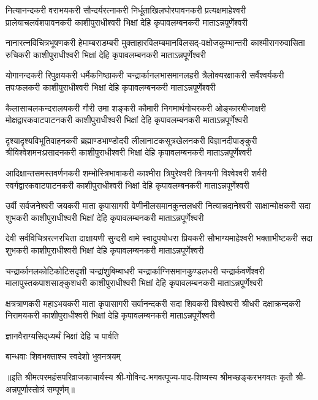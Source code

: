 
\fourlineindentedshloka
{नित्यानन्दकरी वराभयकरी सौन्दर्यरत्नाकरी}
{निर्धूताखिलघोरपावनकरी प्रत्यक्षमाहेश्वरी}
{प्रालेयाचलवंशपावनकरी काशीपुराधीश्वरी}
{भिक्षां देहि कृपावलम्बनकरी माताऽन्नपूर्णेश्वरी}

\fourlineindentedshloka
{नानारत्नविचित्रभूषणकरी हेमाम्बराडम्बरी}
{मुक्ताहारविलम्बमानविलसद्-वक्षोजकुम्भान्तरी}
{काश्मीरागरुवासिता रुचिकरी काशीपुराधीश्वरी}
{भिक्षां देहि कृपावलम्बनकरी माताऽन्नपूर्णेश्वरी}

\fourlineindentedshloka
{योगानन्दकरी रिपुक्षयकरी धर्मैकनिष्ठाकरी}
{चन्द्रार्कानलभासमानलहरी त्रैलोक्यरक्षाकरी}
{सर्वैश्वर्यकरी तपःफलकरी काशीपुराधीश्वरी}
{भिक्षां देहि कृपावलम्बनकरी माताऽन्नपूर्णेश्वरी}

\fourlineindentedshloka
{कैलासाचलकन्दरालयकरी गौरी उमा शङ्करी}
{कौमारी निगमार्थगोचरकरी ओङ्कारबीजाक्षरी}
{मोक्षद्वारकवाटपाटनकरी काशीपुराधीश्वरी}
{भिक्षां देहि कृपावलम्बनकरी माताऽन्नपूर्णेश्वरी}

\fourlineindentedshloka
{दृश्यादृश्यविभूतिवाहनकरी ब्रह्माण्डभाण्डोदरी}
{लीलानाटकसूत्रखेलनकरी विज्ञानदीपाङ्कुरी}
{श्रीविश्वेशमनःप्रसादनकरी काशीपुराधीश्वरी}
{भिक्षां देहि कृपावलम्बनकरी माताऽन्नपूर्णेश्वरी}

\fourlineindentedshloka
{आदिक्षान्तसमस्तवर्णनकरी शम्भोस्त्रिभावाकरी}
{काश्मीरा त्रिपुरेश्वरी त्रिनयनी विश्वेश्वरी शर्वरी}
{स्वर्गद्वारकवाटपाटनकरी काशीपुराधीश्वरी}
{भिक्षां देहि कृपावलम्बनकरी माताऽन्नपूर्णेश्वरी}

\fourlineindentedshloka
{उर्वी सर्वजनेश्वरी जयकरी माता कृपासागरी}
{वेणीनीलसमानकुन्तलधरी नित्यान्नदानेश्वरी}
{साक्षान्मोक्षकरी सदा शुभकरी काशीपुराधीश्वरी}
{भिक्षां देहि कृपावलम्बनकरी माताऽन्नपूर्णेश्वरी}

\fourlineindentedshloka
{देवी सर्वविचित्ररत्नरचिता दाक्षायणी सुन्दरी}
{वामे स्वादुपयोधरा प्रियकरी सौभाग्यमाहेश्वरी}
{भक्ताभीष्टकरी सदा शुभकरी काशीपुराधीश्वरी}
{भिक्षां देहि कृपावलम्बनकरी माताऽन्नपूर्णेश्वरी}

\fourlineindentedshloka
{चन्द्रार्कानलकोटिकोटिसदृशी चन्द्रांशुबिम्बाधरी}
{चन्द्रार्काग्निसमानकुण्डलधरी चन्द्रार्कवर्णेश्वरी}
{मालापुस्तकपाशसाङ्कुशधरी काशीपुराधीश्वरी}
{भिक्षां देहि कृपावलम्बनकरी माताऽन्नपूर्णेश्वरी}

\fourlineindentedshloka
{क्षत्रत्राणकरी महाऽभयकरी माता कृपासागरी}
{सर्वानन्दकरी सदा शिवकरी विश्वेश्वरी श्रीधरी}
{दक्षाक्रन्दकरी निरामयकरी काशीपुराधीश्वरी}
{भिक्षां देहि कृपावलम्बनकरी माताऽन्नपूर्णेश्वरी}

{ज्ञानवैराग्यसिद्‌ध्यर्थं भिक्षां देहि च पार्वति}

{बान्धवाः शिवभक्ताश्च स्वदेशो भुवनत्रयम्}

॥इति  श्रीमत्परमहंसपरिव्राजकाचार्यस्य श्री-गोविन्द-भगवत्पूज्य-पाद-शिष्यस्य
श्रीमच्छङ्करभगवतः कृतौ  श्री-अन्नपूर्णास्तोत्रं सम्पूर्णम्॥
